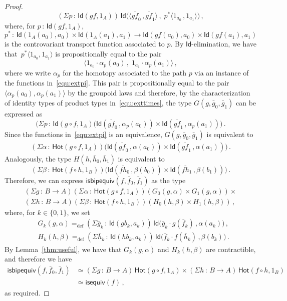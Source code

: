 \documentclass[10pt,a4paper,oneside,reqno]{amsart}
\numberwithin{equation}{section}
\theoremstyle{mythm}
\theoremstyle{mydef}
\theoremstyle{myrmk}
\newcommand{\defeq}{=_{\mathrm{def}}}
\newcommand{\co}{\,{:}\,}
\newcommand{\com}{\circ}
\newcommand{\ct}{\cdot}
\newcommand{\isequiv}{\mathsf{isequiv}}
\newcommand{\Hot}{\mathsf{Hot}}
\newcommand{\Id}{\mathsf{Id}}
\newcommand{\isbipequiv}{\mathsf{isbipequiv}}
\begin{document}
\begin{proof}
\[
(\Sigma p \co  \Id( g f, 1_A)) \, 
\Id 
\big(  
\langle 
\overline{gf}_0  \, ,    \overline{gf}_1 
\rangle \, ,  \; 
 p^*
 \langle 
 1_{a_0} \, , 1_{a_1}  
 \rangle  
 \big) \, ,
\]
where, for $p \co \Id(gf, 1_A)$, 
\[
p^* \co \Id( 1_A(a_0), a_0) \times \Id(1_A(a_1), a_1) \to \Id( gf(a_0), a_0) \times \Id( gf(a_1), a_1) 
\]
is the controvariant transport function associated to $p$. By $\Id$-elimination, 
we have that~$p^* \langle 1_{a_0}, 1_{a_1} \rangle$ is  propositionally equal to the pair 
\[
\langle 1_{a_0} \ct \alpha_p(a_0)  \, , \;   1_{a_1} \ct \alpha_p(a_1)  \rangle \, , 
\]
where we write $\alpha_p$ for the homotopy associated to the path $p$ via an instance of
the functions in~\eqref{equ:extpi}. This pair is propositionally equal 
to the pair $\langle  \alpha_p(a_0), \alpha_p(a_1) \rangle$ by the groupoid laws and 
 therefore, by the characterization of identity types of product types in~\eqref{equ:exttimes},
 the type $G(g,\bar{g}_0,\bar{g}_1)$ can be expressed as
\[
(\Sigma p \co \Id( g \com f, 1_A) 
\big(
\Id(  
\overline{gf}_0 \, ,  \alpha_p(a_0)) 
\times 
\Id( \overline{gf}_1 \, ,  \alpha_p(a_1))
\big) \, .
\]
Since the functions in~\eqref{equ:extpi} is an equivalence, $G(g, \bar{g}_0, \bar{g}_1)$ is equivalent to
\begin{align*}
(\Sigma \alpha \co \Hot( g \com f, 1_A))
\big( \Id  ( \overline{gf}_0 \, ,  \alpha(a_0) ) 
\times 
\Id ( \overline{gf}_1 \, ,  \alpha(a_1) ) 
\big) \, .
\end{align*}
Analogously, the type $H(h,\bar{h}_0,\bar{h}_1)$ is equivalent to
\[
(\Sigma \beta \co \Hot(f \com h, 1_B))
\big(
\Id  (  \overline{fh}_0 \, ,  \beta(b_0) ) 
\times 
\Id(  \overline{fh}_1 \, ,  \beta(b_1))
\big) \, .
\]
Therefore, we can express $\isbipequiv(f, \bar{f}_0, \bar{f}_1)$ as the type
\begin{multline*} 
(\Sigma g \co B \to  A)
(\Sigma \alpha \co \Hot(g \com f,  1_A))( G_0(g,\alpha) \times G_1(g,\alpha)) \times \\
(\Sigma h \co B \to A)
(\Sigma \beta \co\Hot( f \com h, 1_B)) (H_0(h,\beta) \times H_1(h,\beta)) \, ,
\end{multline*} 
where, for $k \in \{ 0,1 \}$, we set
\begin{align*}
& G_k(g,\alpha) \defeq 
(\Sigma \bar{g}_k \co \Id( g b_k,  a_k))  \, \Id \big( \bar{g}_k \ct g (\bar{f}_k)  \, ,  \alpha(a_k) \big) \, , \\
& H_k(h,\beta) \defeq (\Sigma \bar{h}_k \co \Id( h b_k , a_k)) \, \Id \big(\bar{f}_k \ct f (\bar{h}_k)  \, ,  \beta(b_k) \big)  \, .
\end{align*}
By Lemma~\ref{thm:useful}, we have that $G_k(g,\alpha)$ and
 $H_k(h,\beta)$ are contractible, and therefore we have 
\begin{align*} 
\isbipequiv(f,\bar{f}_0, \bar{f}_1) 
  & \simeq  (\Sigma g \co B \to A)  \, \Hot( g \com f , 1_A ) \times 
(\Sigma h  \co B \to A) \,  \Hot( f \com h, 1_B ) \\
 & \simeq \isequiv(f) \, ,
\end{align*} 
as required.
\end{proof}
\end{document}
